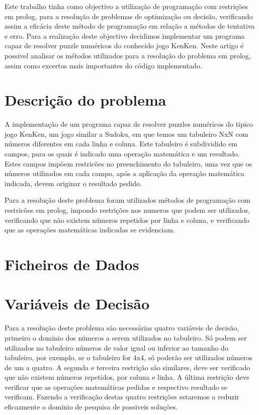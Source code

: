 \documentclass[runningheads,a4paper]{llncs}
\begin{document}
Este trabalho tinha como objectivo a utilização de programação com restrições em prolog, para a resolução de problemas de optimização ou decisão, verificando assim a eficácia deste método de programação em relação a métodos de tentativa e erro.
Para a realização deste objectivo decidimos implementar um programa capaz de resolver puzzle numéricos do conhecido jogo KenKen.
Neste artigo é possivel analisar os métodos utilizados para a resolução do problema em prolog, assim como excertos mais importantes do código implementado.


\section{Descrição do problema}
A implementação de um programa capaz de resolver puzzles numéricos do tipico jogo KenKen, um jogo similar a Sudoku, em que temos um tabuleiro NxN com números diferentes em cada linha e coluna. Este tabuleiro é subdividido em campos, para os quais é indicado uma operação matemática e um resultado. Estes campos impôem restricões no preenchimento do tabuleiro, uma vez que os números utilizados em cada campo, após a aplicação da operação matemática indicada, devem originar o resultado pedido.


Para a resolução deste problema foram utilizados métodos de programação com restricões em prolog, impondo restrições nos numeros que podem ser utilizados, verificando que não existem números repetidos por linha e coluna, e verificando que as operações matemáticas indicadas se evidenciam.

\section{Ficheiros de Dados}

\section{Variáveis de Decisão}
Para a resolução deste problema são necessárias quatro variáveis de decisão, primeiro o dominio dos números a serem utilizados no tabuleiro. Só podem ser utilizados no tabuleiro números de valor igual ou inferior ao tamanho do tabuleiro, por exemplo, se o tabuleiro for 4x4, só poderão ser utilizados números de um a quatro.
A segunda e terceira restrição são similares, deve ser verificado que não existem números repetidos, por coluna e linha.
A última restrição deve verificar que as operações matemáticas pedidas e respectivo resultado se verificam.
Fazendo a verificação destas quatro restrições estaremos a reduzir eficazmente o dominio de pesquisa de possiveis soluções.
\end{document}
